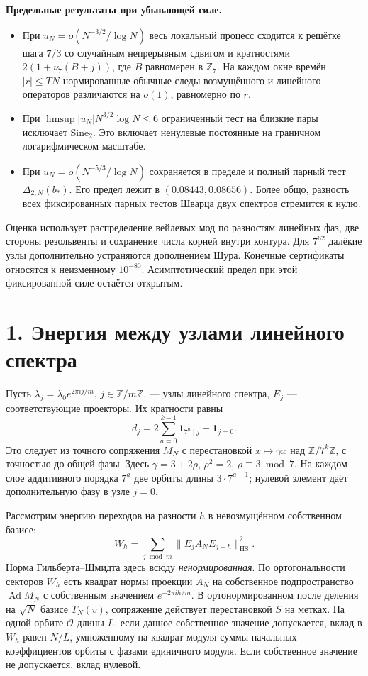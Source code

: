 \documentclass[11pt,a4paper]{article}
\newcommand{\Z}{\mathbb Z}
\newcommand{\si}{\mathrm{Sine}_2}
\newcommand{\sect}[1]{\section*{\sffamily\color{ink}#1}}
\newcommand{\subt}[1]{\par\medskip\noindent\textbf{#1.}\quad}
\newcommand{\Ad}{\operatorname{Ad}}
\newcommand{\HS}{\mathrm{HS}}
\begin{document}
\subt{Предельные результаты при убывающей силе}
\begin{itemize}
 \item При \(u_N=o(N^{-3/2}/\log N)\) весь локальный процесс сходится к решётке шага \(7/3\) со случайным непрерывным сдвигом и кратностями \(2(1+\nu_7(B+j))\), где \(B\) равномерен в \(\mathbb Z_7\). На каждом окне времён \(|r|\le TN\) нормированные обычные следы возмущённого и линейного операторов различаются на \(o(1)\), равномерно по \(r\).
 \item При \(\limsup |u_N|N^{3/2}\log N\le6\) ограниченный тест на близкие пары исключает \(\si\). Это включает ненулевые постоянные на граничном логарифмическом масштабе.
 \item При \(u_N=o(N^{-5/3}/\log N)\) сохраняется в пределе и полный парный тест \(\Delta_{2,N}(b_*)\). Его предел лежит в \((0.08443,0.08656)\). Более общо, разность всех фиксированных парных тестов Шварца двух спектров стремится к нулю.
\end{itemize}
Оценка использует распределение вейлевых мод по разностям линейных фаз, две стороны резольвенты и сохранение числа корней внутри контура. Для \(7^{62}\) далёкие узлы дополнительно устраняются дополнением Шура. Конечные сертификаты относятся к неизменному \(10^{-80}\). Асимптотический предел при этой фиксированной силе остаётся открытым.
\newpage
\sect{1. Энергия между узлами линейного спектра}
Пусть \(\lambda_j=\lambda_0e^{2\pi i j/m}\), \(j\in\Z/m\Z\), --- узлы линейного спектра, \(E_j\) --- соответствующие проекторы. Их кратности равны
\begin{equation}
    d_j=2\sum_{a=0}^{k-1}\mathbf1_{7^a\mid j}+\mathbf1_{j=0}.
                                                            \tag{1}
\end{equation}
Это следует из точного сопряжения \(M_N\) с перестановкой \(x\mapsto\gamma x\) над \(\Z/7^k\Z\), с точностью до общей фазы. Здесь \(\gamma=3+2\rho\), \(\rho^2=2\), \(\rho\equiv3\bmod7\). На каждом слое аддитивного порядка \(7^a\) две орбиты длины \(3\cdot7^{a-1}\); нулевой элемент даёт дополнительную фазу в узле \(j=0\).

Рассмотрим энергию переходов на разности \(h\) в невозмущённом собственном базисе:
\[
                    W_h=\sum_{j\bmod m}\|E_j A_N E_{j+h}\|_{\HS}^2 .
\]
Норма Гильберта--Шмидта здесь всюду \emph{ненормированная}. По ортогональности секторов \(W_h\) есть квадрат нормы проекции \(A_N\) на собственное подпространство \(\Ad M_N\) с собственным значением \(e^{-2\pi i h/m}\). В ортонормированном после деления на \(\sqrt N\) базисе \(T_N(v)\), сопряжение действует перестановкой \(S\) на метках. На одной орбите \(\mathcal O\) длины \(L\), если данное собственное значение допускается, вклад в \(W_h\) равен \(N/L\), умноженному на квадрат модуля суммы начальных коэффициентов орбиты с фазами единичного модуля. Если собственное значение не допускается, вклад нулевой.
\end{document}
